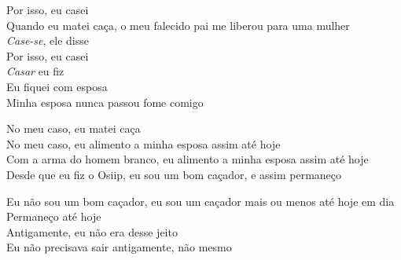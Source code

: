 \begin{linenumbers}\begingroup\raggedright
 
\noindent  Por isso, eu casei\\
 Quando eu matei caça, o meu falecido pai me liberou para uma mulher\\
 \emph{Case-se}, ele disse\\
 Por isso, eu casei\\
 \emph{Casar} eu fiz\\
 Eu fiquei com esposa\\
  Minha esposa nunca passou fome comigo
 
\end{linenumbers}\endgroup

\bigskip

\begin{linenumbers}\begingroup\raggedright
 
\noindent  No meu caso, eu matei caça\\
 No meu caso, eu alimento a minha esposa assim até hoje\\
 Com a arma do homem branco, eu alimento a minha esposa assim até hoje\\
 Desde que eu fiz o Osiip, eu sou um bom caçador, e assim permaneço
 
\end{linenumbers}\endgroup

\bigskip

\begin{linenumbers}\begingroup\raggedright
 
\noindent  Eu não sou um bom caçador, eu sou um caçador mais ou menos até hoje em dia\\
 Permaneço até hoje\\
 Antigamente, eu não era desse jeito\\
 Eu não precisava sair antigamente, não mesmo
 
\end{linenumbers}\endgroup

